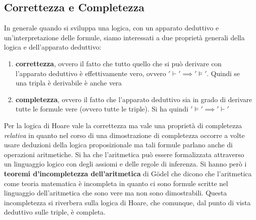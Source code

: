 				     \subsection{Correttezza e Completezza}
				      				In generale quando si sviluppa una logica, con un apparato deduttivo e
				      				un'interpretazione delle formule, siamo interessati a due proprietà generali
				      				della logica e dell'apparato deduttivo:
				      				\begin{enumerate}
				      					\item \textbf{correttezza}, ovvero il fatto che tutto quello che si può
				      					      derivare con l'apparato deduttivo è effettivamente vero, ovvero
				      					      $'\vdash' \implies '\vDash'$. Quindi se una tripla è derivabile è anche vera
				      					\item \textbf{completezza}, ovvero il fatto che l'apparato deduttivo sia in
				      					      grado di derivare tutte le formule vere (ovvero tutte le triple). Si ha
				      					      quindi $'\vDash' \implies '\vdash'$
				      				\end{enumerate}
				      				Per la logica di Hoare vale la correttezza ma vale una proprietà di completezza \textit{relativa} in quanto nel corso di una dimostrazione di completezza
				      				occorre a volte usare deduzioni della logica proposizionale ma tali formule
				      				parlano anche di operazioni aritmetiche. Si ha che l'aritmetica può essere
				      				formalizzata attraverso un linguaggio logico con degli assiomi e delle regole di
				      				inferenza. Si hanno però i \textbf{teoremi d'incompletezza dell'aritmetica} di
				      				G\"{o}del che dicono che l'aritmetica come teoria matematica è incompleta in
				      				quanto ci sono formule scritte nel linguaggio dell'aritmetica che sono vere ma
				      				non sono dimostrabili. Questa incompletezza si riverbera sulla logica di Hoare,
				      				che comunque, dal punto di vista deduttivo sulle triple, è completa.
